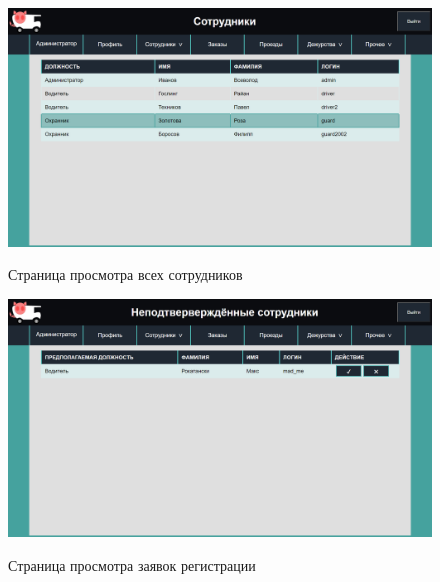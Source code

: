 \begin{figure}[h!] \label{all_profiles_sc}
	\begin{center}
		{\includegraphics[scale=0.43, angle=0]{sc/all_profiles}}
		\caption{Страница просмотра всех сотрудников}
	\end{center}
\end{figure}

\begin{figure}[h!] \label{unver_sc}
	\begin{center}
		{\includegraphics[scale=0.43, angle=0]{sc/unver}}
		\caption{Страница просмотра заявок регистрации}
	\end{center}
\end{figure}

